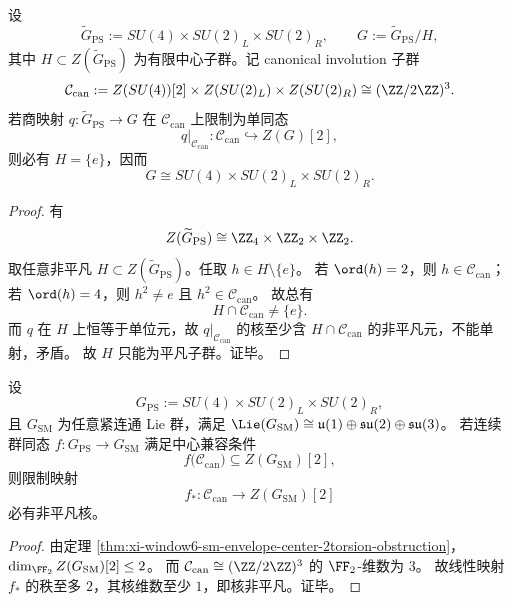 \begin{theorem}\label{thm:xi-window6-ps-faithful-canonical-descent-unique}
设
\[
\widetilde G_{\mathrm{PS}}:=SU(4)\times SU(2)_L\times SU(2)_R,\qquad
G:=\widetilde G_{\mathrm{PS}}/H,
\]
其中 \(H\subset Z(\widetilde G_{\mathrm{PS}})\) 为有限中心子群。记 canonical involution 子群
\[
\mathcal C_{\mathrm{can}}
:=Z(SU(4))[2]\times Z(SU(2)_L)\times Z(SU(2)_R)
\cong (\ZZ/2\ZZ)^3.
\]
若商映射 \(q:\widetilde G_{\mathrm{PS}}\to G\) 在 \(\mathcal C_{\mathrm{can}}\) 上限制为单同态
\[
q|_{\mathcal C_{\mathrm{can}}}:\mathcal C_{\mathrm{can}}\hookrightarrow Z(G)[2],
\]
则必有 \(H=\{e\}\)，因而
\[
G\cong SU(4)\times SU(2)_L\times SU(2)_R.
\]
\end{theorem}
\begin{proof}
有
\[
Z(\widetilde G_{\mathrm{PS}})
\cong \ZZ_4\times \ZZ_2\times \ZZ_2.
\]
取任意非平凡 \(H\subset Z(\widetilde G_{\mathrm{PS}})\)。任取 \(h\in H\setminus\{e\}\)。
若 \(\ord(h)=2\)，则 \(h\in \mathcal C_{\mathrm{can}}\)；
若 \(\ord(h)=4\)，则 \(h^2\neq e\) 且 \(h^2\in \mathcal C_{\mathrm{can}}\)。
故总有
\[
H\cap \mathcal C_{\mathrm{can}}\neq \{e\}.
\]
而 \(q\) 在 \(H\) 上恒等于单位元，故 \(q|_{\mathcal C_{\mathrm{can}}}\) 的核至少含
\(H\cap \mathcal C_{\mathrm{can}}\) 的非平凡元，不能单射，矛盾。
故 \(H\) 只能为平凡子群。证毕。
\end{proof}

\begin{theorem}\label{thm:xi-window6-ps-to-sm-center2-kernel}
设
\[
G_{\mathrm{PS}}:=SU(4)\times SU(2)_L\times SU(2)_R,
\]
且 \(G_{\mathrm{SM}}\) 为任意紧连通 Lie 群，满足
\(
\Lie(G_{\mathrm{SM}})\cong \mathfrak u(1)\oplus\mathfrak{su}(2)\oplus\mathfrak{su}(3)
\)。
若连续群同态
\(
f:G_{\mathrm{PS}}\to G_{\mathrm{SM}}
\)
满足中心兼容条件
\[
f\bigl(\mathcal C_{\mathrm{can}}\bigr)\subseteq Z(G_{\mathrm{SM}})[2],
\]
则限制映射
\[
f_*:\mathcal C_{\mathrm{can}}\longrightarrow Z(G_{\mathrm{SM}})[2]
\]
必有非平凡核。
\end{theorem}
\begin{proof}
由定理 \ref{thm:xi-window6-sm-envelope-center-2torsion-obstruction}，
\(
\dim_{\FF_2} Z(G_{\mathrm{SM}})[2]\le 2
\)。
而
\(
\mathcal C_{\mathrm{can}}\cong (\ZZ/2\ZZ)^3
\)
的 \(\FF_2\)-维数为 \(3\)。
故线性映射 \(f_*\) 的秩至多 \(2\)，其核维数至少 \(1\)，即核非平凡。证毕。
\end{proof}


